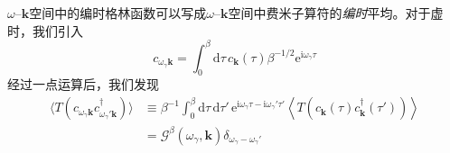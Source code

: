 $\omega$--$\pmb{k}$空间中的编时格林函数可以写成$\omega$--$\pmb{k}$空间中费米子算符的\emph{编时}平均。对于虚时，我们引入
\begin{equation*}
c_{\omega_{\gamma}\pmb{k}}=\int_{0}^{\beta}\mathrm{d}\tau\, c_{\pmb{k}}(\tau)\beta^{-1/2}\mathrm{e}^{\mathrm{i}\omega_{\gamma}\tau}
\end{equation*}
经过一点运算后，我们发现
\begin{align*}
\langle T(c_{\omega_{\gamma}\pmb{k}}c_{\omega_{\gamma}'\pmb{k}}^{\dagger})\rangle&\equiv\beta^{-1}\int_{0}^{\beta}\mathrm{d}\tau\,\mathrm{d}\tau'\,\mathrm{e}^{\mathrm{i}\omega_{\gamma}\tau-\mathrm{i}\omega_{\gamma}'\tau'}\left\langle T\left(c_{\pmb{k}}(\tau)c_{\pmb{k}}^{\dagger}(\tau')\right)\right\rangle\\
&=\mathcal{G}^{\beta}(\omega_{\gamma},\pmb{k})\delta_{\omega_{\gamma}-\omega_{\gamma}'}\tag{4.2.10}
\end{align*}

